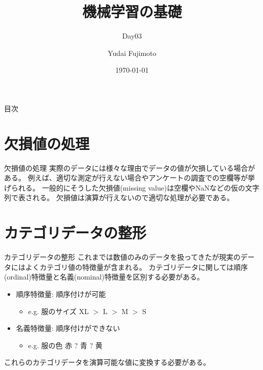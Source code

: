 \documentclass[aspectratio=169, dvipdfmx, 11pt]{beamer} %
\title[Day03]{機械学習の基礎}
\subtitle{Day03}
\author[Yudai Fujimoto]{Yudai Fujimoto}
\institute[SUS]{Suwa University of Science}
\date{\today}
\begin{document}
\maketitle

\begin{frame}{目次}
    \tableofcontents
\end{frame}

\section{欠損値の処理}
\begin{frame}{欠損値の処理}
    実際のデータには様々な理由でデータの値が欠損している場合がある。
    例えば、適切な測定が行えない場合やアンケートの調査での空欄等が挙げられる。
    一般的にそうした欠損値(missing value)は空欄やNaNなどの仮の文字列で表される。
    欠損値は演算が行えないので適切な処理が必要である。
\end{frame}

\section{カテゴリデータの整形}
\begin{frame}{カテゴリデータの整形}
    これまでは数値のみのデータを扱ってきたが現実のデータにはよくカテゴリ値の特徴量が含まれる。
    カテゴリデータに関しては順序(ordinal)特徴量と名義(nominal)特徴量を区別する必要がある。
    \vspace{1em}
    \begin{itemize}
        \item 順序特徴量: 順序付けが可能
        \begin{itemize}
            \item e.g. 服のサイズ XL \(>\) L \(>\) M \(>\) S
        \end{itemize}
        \item 名義特徴量: 順序付けができない
        \begin{itemize}
            \item e.g. 服の色 赤 ? 青 ? 黄
        \end{itemize}
    \end{itemize}
    \vspace{1em}
    これらのカテゴリデータを演算可能な値に変換する必要がある。
\end{frame}
\end{document}
